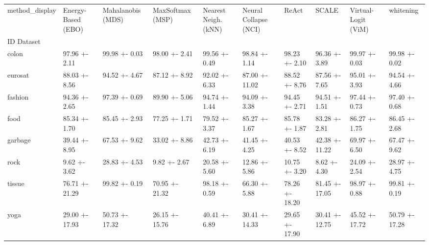 \begin{tabular}{llllllllll}
\toprule
method_display & Energy-Based (EBO) & Mahalanobis (MDS) & MaxSoftmax (MSP) & Nearest Neigh. (kNN) & Neural Collapse (NCI) & ReAct & SCALE & Virtual-Logit (ViM) & whitening \\
ID Dataset &  &  &  &  &  &  &  &  &  \\
\midrule
colon & 97.96 +- 2.11 & 99.98 +- 0.03 & 98.00 +- 2.41 & 99.56 +- 0.49 & 98.84 +- 1.14 & 98.23 +- 2.10 & 96.36 +- 3.89 & 99.97 +- 0.03 & 99.98 +- 0.02 \\
eurosat & 88.03 +- 8.56 & 94.52 +- 4.67 & 87.12 +- 8.92 & 92.02 +- 6.33 & 87.00 +- 11.02 & 88.52 +- 8.76 & 87.56 +- 7.65 & 95.01 +- 3.93 & 94.54 +- 4.66 \\
fashion & 94.36 +- 2.65 & 97.39 +- 0.69 & 89.90 +- 5.06 & 94.74 +- 1.44 & 94.09 +- 3.38 & 94.45 +- 2.71 & 94.51 +- 1.51 & 97.44 +- 0.73 & 97.40 +- 0.68 \\
food & 85.34 +- 1.70 & 85.45 +- 2.93 & 77.25 +- 1.71 & 79.52 +- 3.37 & 85.27 +- 1.67 & 85.78 +- 1.87 & 83.28 +- 2.81 & 86.27 +- 1.75 & 86.45 +- 2.68 \\
garbage & 39.44 +- 8.95 & 67.53 +- 9.62 & 33.02 +- 8.86 & 42.73 +- 6.19 & 41.45 +- 4.25 & 40.53 +- 8.52 & 42.38 +- 11.22 & 69.97 +- 6.50 & 67.47 +- 9.62 \\
rock & 9.62 +- 3.62 & 28.83 +- 4.53 & 9.82 +- 2.67 & 20.58 +- 5.60 & 12.86 +- 5.86 & 10.75 +- 3.20 & 8.62 +- 4.30 & 24.09 +- 2.54 & 28.97 +- 4.75 \\
tissue & 76.71 +- 21.29 & 99.82 +- 0.19 & 70.95 +- 21.32 & 98.18 +- 0.59 & 66.30 +- 5.88 & 78.26 +- 18.20 & 81.45 +- 17.05 & 98.97 +- 0.88 & 99.81 +- 0.19 \\
yoga & 29.00 +- 17.93 & 50.73 +- 17.32 & 26.15 +- 15.76 & 40.41 +- 6.89 & 30.41 +- 14.33 & 29.65 +- 17.90 & 30.41 +- 12.75 & 45.52 +- 17.72 & 50.79 +- 17.28 \\
\bottomrule
\end{tabular}
